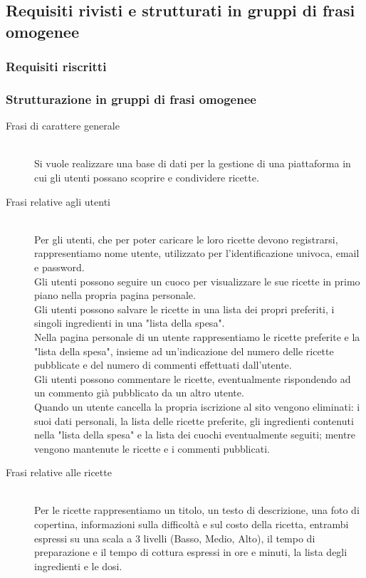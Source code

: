 \documentclass[12pt]{extarticle}
\begin{document}
\newpage

\subsection{Requisiti rivisti e strutturati in gruppi di frasi omogenee}

\subsubsection{Requisiti riscritti}
\subsubsection{Strutturazione in gruppi di frasi omogenee}
\begin{description}
    \item[Frasi di carattere generale] \hfill 
    \\ Si vuole realizzare una base di dati per la gestione di una piattaforma in cui gli utenti possano scoprire e condividere ricette. 
    \item[Frasi relative agli utenti] \hfill
    \\ Per gli utenti, che per poter caricare le loro ricette devono registrarsi, rappresentiamo nome utente, utilizzato per l'identificazione univoca, email e password.
    \\ Gli utenti possono seguire un cuoco per visualizzare le sue ricette in primo piano nella propria pagina personale.
    \\ Gli utenti possono salvare le ricette in una lista dei propri preferiti, i singoli ingredienti in una "lista della spesa". 
    \\ Nella pagina personale di un utente rappresentiamo le ricette preferite e la "lista della spesa", insieme ad un'indicazione del numero delle ricette pubblicate e del numero di commenti effettuati dall'utente.
    \\ Gli utenti possono commentare le ricette, eventualmente rispondendo ad un commento già pubblicato da un altro utente.
    \\ Quando un utente cancella la propria iscrizione al sito vengono eliminati: i suoi dati personali, la lista delle ricette preferite, gli ingredienti contenuti nella "lista della spesa" e la lista dei cuochi eventualmente seguiti; mentre vengono mantenute le ricette e i commenti pubblicati.
    \item[Frasi relative alle ricette] \hfill
    \\ Per le ricette rappresentiamo un titolo, un testo di descrizione, una foto di copertina, informazioni sulla difficoltà e sul costo della ricetta, entrambi espressi su una scala a 3 livelli (Basso, Medio, Alto), il tempo di preparazione e il tempo di cottura espressi in ore e minuti, la lista degli ingredienti e le dosi.

\end{description}
\end{document}

